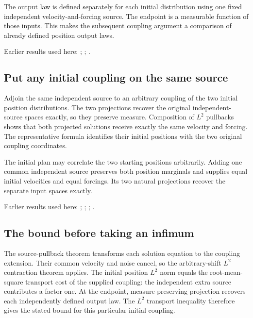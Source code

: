 \documentclass[11pt,a4paper]{report}
\begin{document}
The output law is defined separately for each initial distribution using one fixed independent velocity-and-forcing source. The endpoint is a measurable function of those inputs. This makes the subsequent coupling argument a comparison of already defined position output laws.



Earlier results used here: \cite[Section~3.13.2]{LangevinLean2026ULASC}; \cite[Section~3.13.5]{LangevinLean2026ULASC}; \cite[Section~3.17.1]{LangevinLean2026ULASC}.
\subsection{\texorpdfstring{Put any initial coupling on the same source}{Put any initial coupling on the same source}}
\label{report-step-KineticLangevin-ProductContinuousFlow-lean-2}


Adjoin the same independent source to an arbitrary coupling of the two initial position distributions. The two projections recover the original independent-source spaces exactly, so they preserve measure. Composition of \(L^{2}\) pullbacks shows that both projected solutions receive exactly the same velocity and forcing. The representative formula identifies their initial positions with the two original coupling coordinates.



The initial plan may correlate the two starting positions arbitrarily. Adding one common independent source preserves both position marginals and supplies equal initial velocities and equal forcings. Its two natural projections recover the separate input spaces exactly.



Earlier results used here: \cite[Section~3.17.1]{LangevinLean2026ULASC}; \cite[Section~3.22.2]{LangevinLean2026ULASC}; \cite[Section~3.22.3]{LangevinLean2026ULASC}; \cite[Section~3.22.9]{LangevinLean2026ULASC}.
\subsection{\texorpdfstring{The bound before taking an infimum}{The bound before taking an infimum}}
\label{report-step-KineticLangevin-ProductContinuousFlow-lean-3}


The source-pullback theorem transforms each solution equation to the coupling extension. Their common velocity and noise cancel, so the arbitrary-shift \(L^{2}\) contraction theorem applies. The initial position \(L^{2}\) norm equals the root-mean-square transport cost of the supplied coupling: the independent extra source contributes a factor one. At the endpoint, measure-preserving projection recovers each independently defined output law. The \(L^{2}\) transport inequality therefore gives the stated bound for this particular initial coupling.
\end{document}
